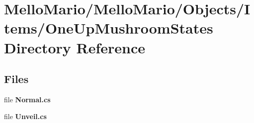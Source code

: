 \section{Mello\+Mario/\+Mello\+Mario/\+Objects/\+Items/\+One\+Up\+Mushroom\+States Directory Reference}
\label{dir_e8869a1866e0a6d0c944c7b243d84b75}
\subsection*{Files}
\begin{DoxyCompactItemize}
\item 
file \textbf{ Normal.\+cs}
\item 
file \textbf{ Unveil.\+cs}
\end{DoxyCompactItemize}

